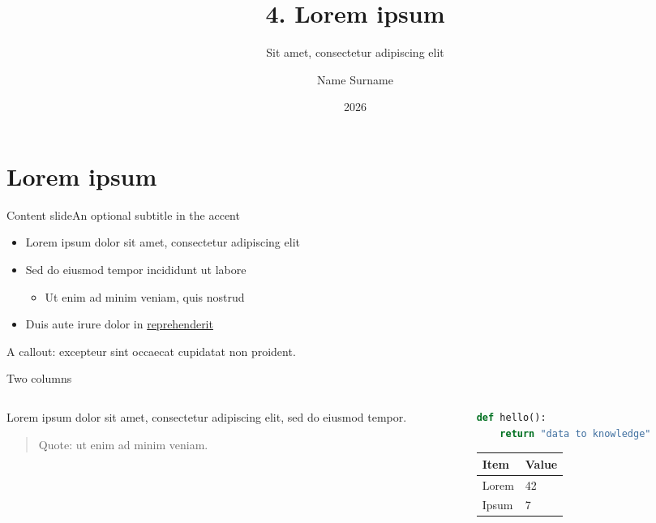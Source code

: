 \documentclass[aspectratio=169]{beamer}
\title{4. Lorem ipsum}
\subtitle{Sit amet, consectetur adipiscing elit}
\author{Name Surname}
\institute{Event}
\date{2026}
\begin{document}
\maketitle

\section{Lorem ipsum}  %

\begin{frame}{Content slide}{An optional subtitle in the accent}
  \begin{itemize}
    \item Lorem ipsum dolor sit amet, \alert{consectetur} adipiscing elit
    \item Sed do eiusmod tempor incididunt ut labore
      \begin{itemize}
        \item Ut enim ad minim veniam, quis nostrud
      \end{itemize}
    \item Duis aute irure dolor in \href{https://dtak.upc.edu}{reprehenderit}
  \end{itemize}
  \begin{block}{}
    A callout: excepteur sint occaecat cupidatat non proident.
  \end{block}
\end{frame}

\begin{frame}[fragile]{Two columns}
  \begin{columns}[T,onlytextwidth]
    \begin{column}{0.48\textwidth}
      Lorem ipsum dolor sit amet, consectetur adipiscing elit, sed do eiusmod tempor.
      \begin{quote}
        Quote: ut enim ad minim veniam.
      \end{quote}
    \end{column}
    \begin{column}{0.48\textwidth}
\begin{lstlisting}[language=Python]
def hello():
    return "data to knowledge"
\end{lstlisting}
      \begin{tabular}{ll}
        \toprule
        Item  & Value \\
        \midrule
        Lorem & 42 \\
        Ipsum & 7 \\
        \bottomrule
      \end{tabular}
    \end{column}
  \end{columns}
\end{frame}
\end{document}
